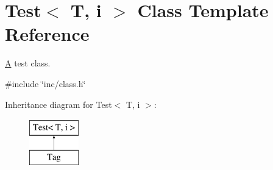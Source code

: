 \hypertarget{classTest}{\section{Test$<$ T, i $>$ Class Template Reference}
\label{classTest}
}


\hyperlink{classA}{A} test class.  




{\ttfamily \#include \char`\"{}inc/class.\-h\char`\"{}}

Inheritance diagram for Test$<$ T, i $>$\-:\begin{figure}[H]
\begin{center}
\leavevmode
\includegraphics[height=2.000000cm]{classTest}
\end{center}
\end{figure}
